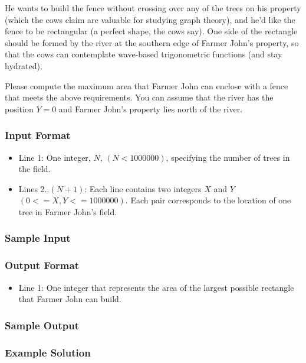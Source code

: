 He wants to build the fence without crossing over any of the trees on his property (which the cows claim are valuable for studying graph theory), and he'd like the fence to be rectangular (a perfect shape, the cows say).
One side of the rectangle should be formed by the river at the southern edge of Farmer John's property, so that the cows can contemplate wave-based trigonometric functions (and stay hydrated).

Please compute the maximum area that Farmer John can enclose with a fence that meets the above requirements.
You can assume that the river has the position $Y=0$ and Farmer John's property lies north of the river.

\subsubsection{Input Format}
\begin{itemize}
	\item Line 1: One integer, $N$, $(N < 1000000)$, specifying the number of trees in the field.
	\item Lines 2..$(N+1)$: Each line contains two integers $X$ and $Y$ $(0 <= X,Y <= 1000000)$.
		Each pair corresponds to the location of one tree in Farmer John's field.
\end{itemize}

\subsubsection{Sample Input}

\subsubsection{Output Format}
\begin{itemize}
  \item Line 1: One integer that represents the area of the largest possible rectangle that Farmer John can build.
\end{itemize}

\subsubsection{Sample Output}

\subsubsection{Example Solution}

